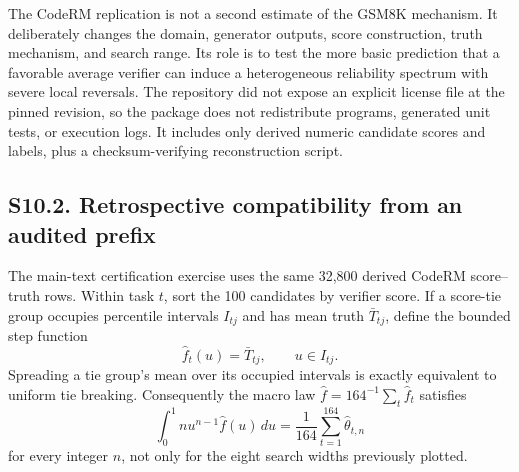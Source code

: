 \documentclass[10pt,twocolumn]{article}
\begin{document}
The CodeRM replication is not a second estimate of the GSM8K mechanism. It deliberately changes the domain, generator outputs, score construction, truth mechanism, and search range. Its role is to test the more basic prediction that a favorable average verifier can induce a heterogeneous reliability spectrum with severe local reversals. The repository did not expose an explicit license file at the pinned revision, so the package does not redistribute programs, generated unit tests, or execution logs. It includes only derived numeric candidate scores and labels, plus a checksum-verifying reconstruction script.

\subsection*{S10.2. Retrospective compatibility from an audited prefix}

The main-text certification exercise uses the same 32,800 derived CodeRM score--truth rows. Within task $t$, sort the 100 candidates by verifier score. If a score-tie group occupies percentile intervals $I_{tj}$ and has mean truth $\bar T_{tj}$, define the bounded step function
\begin{equation}
\widehat f_t(u)=\bar T_{tj},\qquad u\in I_{tj}.
\label{si:eq:task-rank-law}
\end{equation}
Spreading a tie group's mean over its occupied intervals is exactly equivalent to uniform tie breaking. Consequently the macro law $\widehat f=164^{-1}\sum_t\widehat f_t$ satisfies
\begin{equation}
\int_0^1nu^{n-1}\widehat f(u)\,du
=\frac1{164}\sum_{t=1}^{164}\widehat\theta_{t,n}
\label{si:eq:macro-rank-law}
\end{equation}
for every integer $n$, not only for the eight search widths previously plotted.
\end{document}
